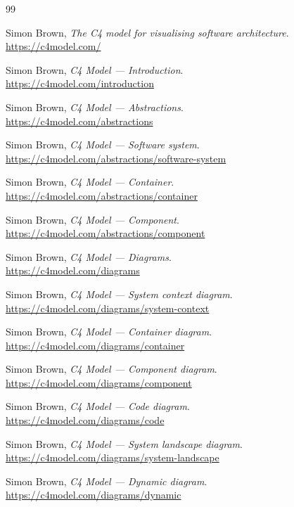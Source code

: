 \documentclass[11pt]{article}
\begin{document}
\newpage
\begin{thebibliography}{99}

Simon Brown, \emph{The C4 model for visualising software architecture}.\\
\url{https://c4model.com/}

Simon Brown, \emph{C4 Model --- Introduction}.\\
\url{https://c4model.com/introduction}

Simon Brown, \emph{C4 Model --- Abstractions}.\\
\url{https://c4model.com/abstractions}

Simon Brown, \emph{C4 Model --- Software system}.\\
\url{https://c4model.com/abstractions/software-system}

Simon Brown, \emph{C4 Model --- Container}.\\
\url{https://c4model.com/abstractions/container}

Simon Brown, \emph{C4 Model --- Component}.\\
\url{https://c4model.com/abstractions/component}

Simon Brown, \emph{C4 Model --- Diagrams}.\\
\url{https://c4model.com/diagrams}

Simon Brown, \emph{C4 Model --- System context diagram}.\\
\url{https://c4model.com/diagrams/system-context}

Simon Brown, \emph{C4 Model --- Container diagram}.\\
\url{https://c4model.com/diagrams/container}

Simon Brown, \emph{C4 Model --- Component diagram}.\\
\url{https://c4model.com/diagrams/component}

Simon Brown, \emph{C4 Model --- Code diagram}.\\
\url{https://c4model.com/diagrams/code}

Simon Brown, \emph{C4 Model --- System landscape diagram}.\\
\url{https://c4model.com/diagrams/system-landscape}

Simon Brown, \emph{C4 Model --- Dynamic diagram}.\\
\url{https://c4model.com/diagrams/dynamic}


\end{thebibliography}
\end{document}
